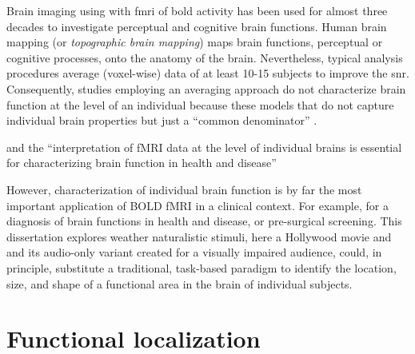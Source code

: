 

%
Brain imaging using with \ac{fmri} of \ac{bold} activity has been used for
almost three decades to investigate perceptual and cognitive brain functions.
%
Human brain mapping (or \textit{topographic brain mapping}) maps brain
functions, perceptual or cognitive processes, onto the anatomy of the brain.
%
Nevertheless, typical analysis procedures average (voxel-wise) data of at least
10-15 subjects to improve the \ac{snr}.
%
Consequently, studies employing an averaging approach do not characterize brain
function at the level of an individual because these models that do not capture
individual brain properties but just a ``common denominator''
\citep{dubois2016building}. 

and the ``interpretation of fMRI data at the level of individual brains is
essential for characterizing brain function in health and disease''
\citep{dubois2016building}

%
However, characterization of individual brain function is by far the most
important application of BOLD fMRI in a clinical context.
%
For example, for a diagnosis of brain functions in health and disease, or
pre-surgical screening.
%
This dissertation explores weather naturalistic stimuli, here a Hollywood movie
and and its audio-only variant created for a visually impaired audience, could,
in principle, substitute a traditional, task-based paradigm to identify the
location, size, and shape of a functional area in the brain of individual
subjects.


\section{Functional localization}




